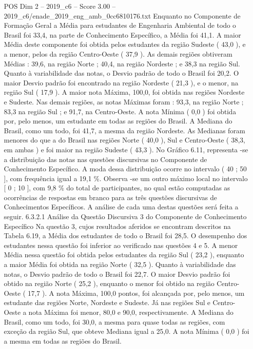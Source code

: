\begin{textsample}{POS Dim 2 – 2019\_c6 – Score 3.00 – 2019\_c6/enade\_2019\_eng\_amb\_0cc6810176.txt}
Enquanto no Componente de Formação Geral a Média para estudantes de Engenharia Ambiental de todo o Brasil foi 33,4, na parte de Conhecimento Específico, a Média foi 41,1.
A maior Média deste componente foi obtida pelos estudantes da região Sudeste ( 43,0 ), e a menor, pelos da região Centro-Oeste ( 37,9 ).
As demais regiões obtiveram Médias : 39,6, na região Norte ; 40,4, na região Nordeste ; e 38,3 na região Sul.
Quanto à variabilidade das notas, o Desvio padrão de todo o Brasil foi 20,2.
O maior Desvio padrão foi encontrado na região Nordeste ( 21,3 ), e o menor, na região Sul ( 17,9 ).
A maior nota Máxima, 100,0, foi obtida nas regiões Nordeste e Sudeste.
Nas demais regiões, as notas Máximas foram : 93,3, na região Norte ; 83,3 na região Sul ; e 91,7, na Centro-Oeste.
A nota Mínima ( 0,0 ) foi obtida por, pelo menos, um estudante em todas as regiões do Brasil.
A Mediana do Brasil, como um todo, foi 41,7, a mesma da região Nordeste.
As Medianas foram menores do que a do Brasil nas regiões Norte ( 40,0 ), Sul e Centro-Oeste ( 38,3, em ambas ) e foi maior na região Sudeste ( 43,3 ).
No Gráfico 6.11, representa -se a distribuição das notas nas questões discursivas no Componente de Conhecimento Específico.
A moda dessa distribuição ocorre no intervalo ( 40 ; 50 ], com frequência igual a 19,1 \%.
Observa -se um outro máximo local no intervalo [ 0 ; 10 ], com 9,8 \% do total de participantes, no qual estão computadas as ocorrências de respostas em branco para as três questões discursivas de Conhecimentos Específicos.
A análise de cada uma destas questões será feita a seguir. 6.3.2.1 Análise da Questão Discursiva 3 do Componente de Conhecimento Específico Na questão 3, cujos resultados aferidos se encontram descritos na Tabela 6.19, a Média dos estudantes de todo o Brasil foi 28,5.
O desempenho dos estudantes nessa questão foi inferior ao verificado nas questões 4 e 5.
A menor Média nessa questão foi obtida pelos estudantes da região Sul ( 23,2 ), enquanto a maior Média foi obtida na região Norte ( 32,5 ).
Quanto à variabilidade das notas, o Desvio padrão de todo o Brasil foi 22,7.
O maior Desvio padrão foi obtido na região Norte ( 25,2 ), enquanto o menor foi obtido na região Centro-Oeste ( 17,7 ).
A nota Máxima, 100,0 pontos, foi alcançada por, pelo menos, um estudante das regiões Norte, Nordeste e Sudeste.
Já nas regiões Sul e Centro-Oeste a nota Máxima foi menor, 80,0 e 90,0, respectivamente.
A Mediana do Brasil, como um todo, foi 30,0, a mesma para quase todas as regiões, com exceção da região Sul, que obteve Mediana igual a 25,0.
A nota Mínima ( 0,0 ) foi a mesma em todas as regiões do Brasil.

\end{textsample}
